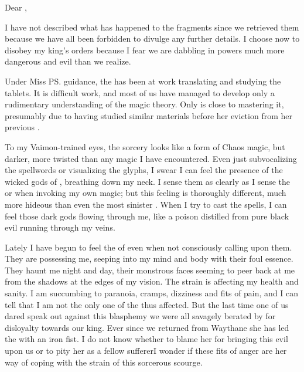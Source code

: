 \begin{diary}%
Dear \Ambrose{} \Onatol, 

I have not described what has happened to the \EreshKali{} fragments since we retrieved them because we have all been forbidden to divulge any further details. 
I choose now to disobey my king's orders because I fear we are dabbling in powers much more dangerous and evil than we realize. 

Under Miss \ps{\Takestsha}{} guidance, the \ishrah{} has been at work translating and studying the tablets. 
It is difficult work, and most of us have managed to develop only a rudimentary understanding of the \EreshKali{} magic theory. 
Only \Takestsha{} is close to mastering it, presumably due to having studied similar materials before her eviction from her previous \ishrah. 

To my Vaimon-trained eyes, the \EreshKali{} sorcery looks like a form of Chaos magic, but darker, more twisted than any \Rethyactic{} magic I have encountered. 
Even just subvocalizing the spellwords or visualizing the glyphs, I swear I can feel the presence of the wicked gods of \EreshKal, breathing down my neck. 
I sense them as clearly as I sense the \sephiroth{} or \qliphoth{} when invoking my own magic; but this feeling is thoroughly different, much more hideous than even the most sinister \qliphah. 
When I try to cast the spells, I can feel those dark gods flowing through me, like a poison distilled from pure black evil running through my veins. 

Lately I have begun to feel the \daemons{} of \EreshKal{} even when not consciously calling upon them. 
They are possessing me, seeping into my mind and body with their foul essence. 
They haunt me night and day, their monstrous faces seeming to peer back at me from the shadows at the edges of my vision. 
The strain is affecting my health and sanity. 
I am succumbing to paranoia, cramps, dizziness and fits of pain, and I can tell that I am not the only one of the \ishrah{} thus affected. 
But the last time one of us dared speak out against this blasphemy we were all savagely berated by \Takestsha{} for disloyalty towards our king. 
Ever since we returned from Waythane she has led the \ishrah{} with an iron fist. 
I do not know whether to blame her for bringing this evil upon us or to pity her as a fellow sufferer\dash I wonder if these fits of anger are her way of coping with the strain of this sorcerous scourge. 


\end{diary}
